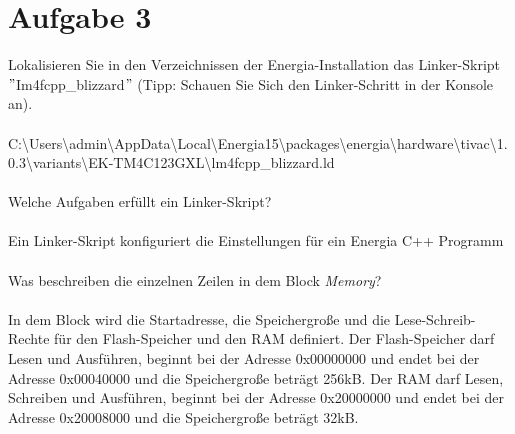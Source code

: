 \section{Aufgabe 3}
Lokalisieren Sie in den Verzeichnissen der Energia-Installation das Linker-Skript $"$Im4fcpp\_blizzard$"$ (Tipp: Schauen Sie Sich den Linker-Schritt in der Konsole an).\\ \\
C:\textbackslash Users\textbackslash admin\textbackslash AppData\textbackslash Local\textbackslash Energia15\textbackslash packages\textbackslash energia\textbackslash hardware\textbackslash  tivac\textbackslash 1.0.3\textbackslash variants\textbackslash EK-TM4C123GXL\textbackslash lm4fcpp\_blizzard.ld\\ \\
Welche Aufgaben erfüllt ein Linker-Skript?\\ \\
Ein Linker-Skript konfiguriert die Einstellungen für ein Energia C++ Programm\\ \\
Was beschreiben die einzelnen Zeilen in dem Block \textit{Memory}?\\ \\
In dem Block wird die Startadresse, die Speichergro\ss{}e und die Lese-Schreib-Rechte für den Flash-Speicher und den RAM definiert. Der Flash-Speicher darf Lesen und Ausführen, beginnt bei der Adresse 0x00000000 und endet bei der Adresse 0x00040000 und die Speichergro\ss{}e beträgt 256kB. Der RAM darf Lesen, Schreiben und Ausführen, beginnt bei der Adresse 0x20000000 und endet bei der Adresse 0x20008000 und die Speichergro\ss{}e beträgt 32kB.
\newpage
